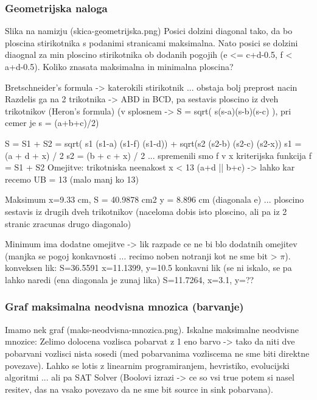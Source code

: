 \documentclass[a4paper,11pt]{article}
\begin{document}
\subsubsection{Geometrijska naloga}

Slika na namizju (skica-geometrijska.png)
Posici dolzini diagonal tako, da bo ploscina stirikotnika s podanimi stranicami maksimalna. Nato posici se dolzini diaognal za min ploscino stirikotnika ob dodanih pogojih (e <= c+d-0.5, f < a+d-0.5). Koliko znasata maksimalna in minimalna ploscina?

Bretschneider's formula -> katerokili stirikotnik ... obstaja bolj preprost nacin
Razdelis ga na 2 trikotnika -> ABD in BCD, pa sestavis ploscino iz dveh trikotnikov (Heron's formula) (v splosnem -> S = sqrt( s(s-a)(s-b)(s-c) ), pri cemer je s = (a+b+c)/2)

S = S1 + S2 = sqrt( s1 (s1-a) (s1-f) (s1-d))  + sqrt(s2 (s2-b) (s2-c) (s2-x))
s1 = (a + d + x) / 2
s2 = (b + c + x) / 2	... spremenili smo f v x
kriterijska funkcija 
f = S1 + S2
Omejitve: trikotniska neenakost
x < 13 (a+d || b+c) -> lahko kar recemo UB = 13 (malo manj ko 13)

Maksimum	x=9.33 cm, S = 40.9878 cm2
					y = 8.896 cm (diagonala e) ... ploscino sestavis iz drugih dveh trikotnikov (naceloma dobis isto ploscino, ali pa iz 2 stranic zracunas drugo diagonalo)
					
Minimum ima dodatne omejitve -> lik razpade ce ne bi blo dodatnih omejitev (manjka se pogoj konkavnosti ... recimo noben notranji kot ne sme bit > $\pi$). 
konveksen lik:
	S=36.5591 x=11.1399, y=10.5
konkavni lik (se ni iskalo, se pa lahko naredi (ena diagonala je zunaj lika)
	S=11.7264, x=3.1, y=?? 


\subsubsection{Graf maksimalna neodvisna mnozica (barvanje)}

Imamo nek graf (maks-neodvisna-mnozica.png). Iskalne maksimalne neodvisne mnozice: Zelimo dolocena vozlisca pobarvat z 1 eno barvo -> tako da niti dve pobarvani vozlisci nista sosedi (med pobarvanima vozliscema ne sme biti direktne povezave).
Lahko se lotis z linearnim programiranjem, hevristiko, evolucijski algoritmi ... ali pa SAT Solver (Boolovi izrazi -> ce so vsi true potem si nasel resitev, das na vsako povezavo da ne sme bit source in sink pobarvana).
\end{document}
